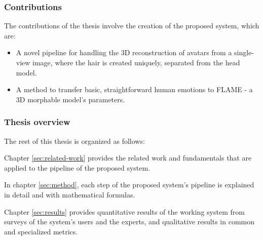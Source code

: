 \subsubsection{Contributions}

The contributions of the thesis involve the creation of the proposed system, which are:

\begin{itemize}
  \item A novel pipeline for handling the 3D reconstruction of avatars from a single-view image, where the hair is created uniquely, separated from the head model.
  \item A method to transfer basic, straightforward human emotions to FLAME - a 3D morphable model's parameters.
\end{itemize}

\subsubsection{Thesis overview}

The rest of this thesis is organized as follows:

Chapter \ref{sec:related-work} provides the related work and fundamentals that are applied to the pipeline of the proposed system.

In chapter \ref{sec:method}, each step of the proposed system's pipeline is explained in detail and with mathematical formulas.

Chapter \ref{sec:results} provides quantitative results of the working system from surveys of the system's users and the experts, and qualitative results in common and specialized metrics.